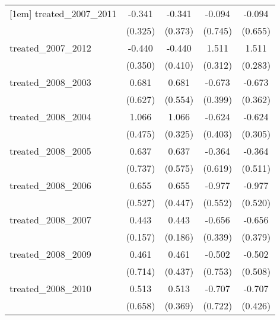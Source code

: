{\begin{tabular}{l*{4}{c}}
[1em]
treated\_2007\_2011&      -0.341         &      -0.341         &      -0.094         &      -0.094         \\
            &     (0.325)         &     (0.373)         &     (0.745)         &     (0.655)         \\
[1em]
treated\_2007\_2012&      -0.440         &      -0.440         &       1.511\sym{***}&       1.511\sym{***}\\
            &     (0.350)         &     (0.410)         &     (0.312)         &     (0.283)         \\
[1em]
treated\_2008\_2003&       0.681         &       0.681         &      -0.673         &      -0.673         \\
            &     (0.627)         &     (0.554)         &     (0.399)         &     (0.362)         \\
[1em]
treated\_2008\_2004&       1.066\sym{*}  &       1.066\sym{**} &      -0.624         &      -0.624\sym{*}  \\
            &     (0.475)         &     (0.325)         &     (0.403)         &     (0.305)         \\
[1em]
treated\_2008\_2005&       0.637         &       0.637         &      -0.364         &      -0.364         \\
            &     (0.737)         &     (0.575)         &     (0.619)         &     (0.511)         \\
[1em]
treated\_2008\_2006&       0.655         &       0.655         &      -0.977         &      -0.977         \\
            &     (0.527)         &     (0.447)         &     (0.552)         &     (0.520)         \\
[1em]
treated\_2008\_2007&       0.443\sym{**} &       0.443\sym{*}  &      -0.656         &      -0.656         \\
            &     (0.157)         &     (0.186)         &     (0.339)         &     (0.379)         \\
[1em]
treated\_2008\_2009&       0.461         &       0.461         &      -0.502         &      -0.502         \\
            &     (0.714)         &     (0.437)         &     (0.753)         &     (0.508)         \\
[1em]
treated\_2008\_2010&       0.513         &       0.513         &      -0.707         &      -0.707         \\
            &     (0.658)         &     (0.369)         &     (0.722)         &     (0.426)         \\

\end{tabular}}
